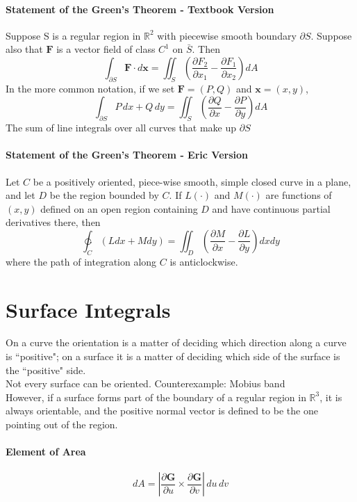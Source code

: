 \documentclass[11pt]{article}
\newcommand{\tb}[1]{\textbf{#1}}
\newcommand{\real}[0]{\mathbb{R}}
\newcommand{\vx}[0]{\tb{x}}
\begin{document}
\paragraph{Statement of the Green's Theorem - Textbook Version}
Suppose S is a regular region in $\real^2$ with piecewise smooth boundary $\partial S$. Suppose also that $\tb{F}$ is a vector field of class $C^1$ on $\bar{S}$. Then
$$\int_{\partial S}\tb{F}\cdot d\vx = \iint_S(\frac{\partial F_2}{\partial x_1} - \frac{\partial F_1}{\partial x_2})dA$$
In the more common notation, if we set $\tb{F} = (P,Q)$ and $\vx = (x,y)$,
$$\int_{\partial S}P \, dx + Q \, dy = \iint_S(\frac{\partial Q}{\partial x} - \frac{\partial P}{\partial y})dA$$
The sum of line integrals over all curves that make up $\partial S$

\paragraph{Statement of the Green's Theorem - Eric Version} Let $C$ be a positively oriented, piece-wise smooth, simple closed curve in a plane, and let $D$ be the region bounded by $C$. If $L(\cdot)$ and $M(\cdot)$ are functions of $(x, y)$ defined on an open region containing $D$ and have continuous partial derivatives there, then
\begin{equation*}
    \ointctrclockwise_C \left(Ldx + Mdy\right) = \iint_D \left(\frac{\partial M}{\partial x} - \frac{\partial L}{\partial y}\right) dxdy
\end{equation*}
where the path of integration along $C$ is anticlockwise.

\section{Surface Integrals}
On a curve the orientation is a matter of deciding which direction along a curve is ``positive"; on a surface it is a matter of deciding which side of the surface is the ``positive" side. \\
Not every surface can be oriented. Counterexample: Mobius band \\
However, if a surface forms part of the boundary of a regular region in $\real^3$, it is always orientable, and the positive normal vector is defined to be the one pointing out of the region.
\paragraph{Element of Area}
$$dA = |\frac{\partial \tb{G}}{\partial u} \times \frac{\partial \tb{G}}{\partial v}| \, du\, dv$$
\end{document}
